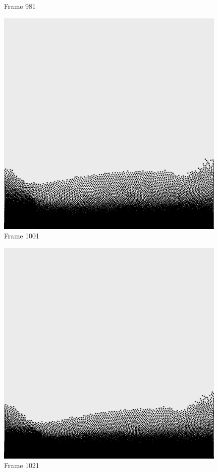 \documentclass[a4paper, 12pt, oneside]{book}
\begin{document}
\begin{figure}[!ht]
\begin{center}
            Frame 981
        \end{center}
    \endminipage
    \hfill
        \begin{center}
            \includegraphics[width=\linewidth]{images/test_case_2/1001.png}
            Frame 1001
        \end{center}
    \endminipage
    \hfill
        \begin{center}
            \includegraphics[width=\linewidth]{images/test_case_2/1021.png}
            Frame 1021
        \end{center}
    \endminipage
    \hfill


\end{figure}
\end{document}
